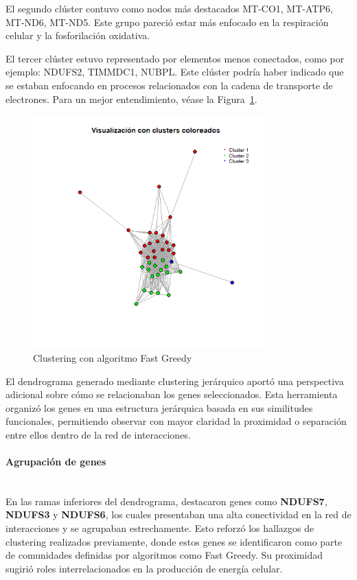 El segundo clúster contuvo como nodos más destacados MT-CO1, MT-ATP6, MT-ND6, MT-ND5. Este grupo pareció estar más enfocado en la respiración celular y la fosforilación oxidativa.

El tercer clúster estuvo representado por elementos menos conectados, como por ejemplo: NDUFS2, TIMMDC1, NUBPL. Este clúster podría haber indicado que se estaban enfocando en procesos relacionados con la cadena de transporte de electrones. Para un mejor entendimiento, véase la Figura~\ref{fig:imagen2}.

\begin{figure}
	\centering
	\includegraphics[width=0.8\textwidth]{figures/colored_Fast_Greedy.png}
	\caption{Clustering con algoritmo Fast Greedy}
	\label{fig:imagen2}
\end{figure}

El dendrograma generado mediante clustering jerárquico aportó una perspectiva adicional sobre cómo se relacionaban los genes seleccionados. Esta herramienta organizó los genes en una estructura jerárquica basada en sus similitudes funcionales, permitiendo observar con mayor claridad la proximidad o separación entre ellos dentro de la red de interacciones.

\paragraph{Agrupación de genes} \mbox{}\\

En las ramas inferiores del dendrograma, destacaron genes como \textbf{NDUFS7}, \textbf{NDUFS3} y \textbf{NDUFS6}, los cuales presentaban una alta conectividad en la red de interacciones y se agrupaban estrechamente. Esto reforzó los hallazgos de clustering realizados previamente, donde estos genes se identificaron como parte de comunidades definidas por algoritmos como Fast Greedy. Su proximidad sugirió roles interrelacionados en la producción de energía celular.

